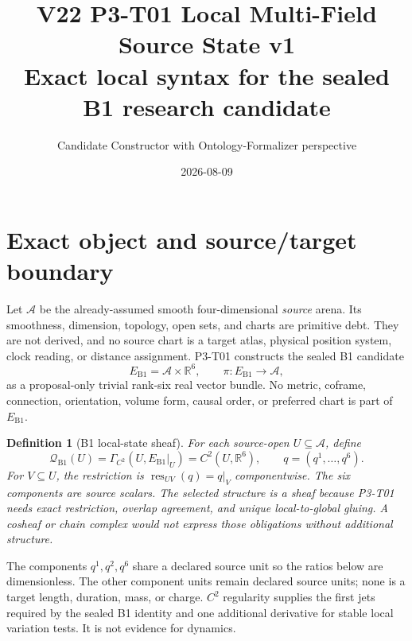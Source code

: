 \documentclass[11pt]{article}
\title{V22 P3-T01 Local Multi-Field Source State v1\\
\large Exact local syntax for the sealed B1 research candidate}
\author{Candidate Constructor with Ontology-Formalizer perspective}
\date{2026-08-09}
\newtheorem{definition}{Definition}
\newcommand{\A}{\mathcal A}
\newcommand{\Q}{\mathcal Q_{\mathrm{B1}}}
\newcommand{\E}{E_{\mathrm{B1}}}
\begin{document}
\sloppy
\maketitle

\begin{center}
\end{center}

\section{Exact object and source/target boundary}

Let $\A$ be the already-assumed smooth four-dimensional \emph{source} arena.
Its smoothness, dimension, topology, open sets, and charts are primitive debt.
They are not derived, and no source chart is a target atlas, physical position
system, clock reading, or distance assignment.  P3-T01 constructs the sealed
B1 candidate
\[
   \E=\A\times\mathbb R^6,\qquad \pi:\E\to\A,
\]
as a proposal-only trivial rank-six real vector bundle.  No metric, coframe,
connection, orientation, volume form, causal order, or preferred chart is part
of $\E$.

\begin{definition}[B1 local-state sheaf]
For each source-open $U\subseteq\A$, define
\[
  \Q(U)=\Gamma_{C^2}(U,\E|_U)=C^2(U,\mathbb R^6),
  \qquad q=(q^1,\ldots,q^6).
\]
For $V\subseteq U$, the restriction is
$\operatorname{res}_{UV}(q)=q|_V$ componentwise.  The six components are
source scalars.  The selected structure is a sheaf because P3-T01 needs exact
restriction, overlap agreement, and unique local-to-global gluing.  A cosheaf
or chain complex would not express those obligations without additional
structure.
\end{definition}

The components $q^1,q^2,q^6$ share a declared source unit so the ratios below
are dimensionless.  The other component units remain declared source units;
none is a target length, duration, mass, or charge.  $C^2$ regularity supplies
the first jets required by the sealed B1 identity and one additional derivative
for stable local variation tests.  It is not evidence for dynamics.
\end{document}
